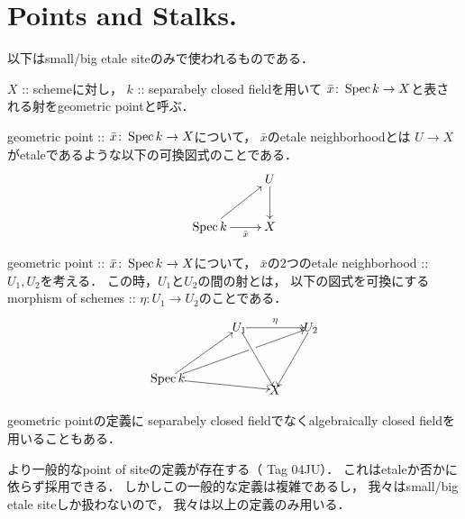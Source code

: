 \documentclass[a4paper, dvipdfmx]{jsarticle}
\begin{document}
\section{Points and Stalks.}
以下はsmall/big etale siteのみで使われるものである．
\begin{Def}
\begin{myenum}
    \item 
    $X$ :: schemeに対し，
    $k$ :: separabely closed fieldを用いて
    $\bar{x} \colon \operatorname{Spec} k \to X$と表される射をgeometric pointと呼ぶ．

    \item
    geometric point :: $\bar{x} \colon \operatorname{Spec} k \to X$について，
    $\bar{x}$のetale neighborhoodとは
    $U \to X$がetaleであるような以下の可換図式のことである．
    \[\xymatrix{
        {} & U \ar[d]\\
        \Spec k \ar[r]_-{\bar{x}} \ar[ru]& X
    }\]

    \item
    geometric point :: $\bar{x} \colon \operatorname{Spec} k \to X$について，
    $\bar{x}$の$2$つのetale neighborhood :: $U_1, U_2$を考える．
    この時，$U_1$と$U_2$の間の射とは，
    以下の図式を可換にするmorphism of schemes :: $\eta \colon U_1 \to U_2$のことである．
    \begin{equation*}
    \begin{xy}
        (0,17.32) *{U_1}="U1", (20, 17.32) *{U_2}="U2",
        (-20, 3) *{\Spec k}="k", (10,0) *{X}="X",
        \ar "U1";"X" \ar "U2";"X" \ar "U1";"U2"^{\eta}
        \ar "k";"U1" \ar|(.59)\hole "k";"U2" \ar "k";"X"
    \end{xy}
    \end{equation*}
\end{myenum}
\end{Def}

\begin{Remark}
    geometric pointの定義に
    separabely closed fieldでなくalgebraically closed fieldを用いることもある．
\end{Remark}

\begin{Remark}
    より一般的なpoint of siteの定義が存在する（\cite{SP} Tag 04JU）．
    これはetaleか否かに依らず採用できる．
    しかしこの一般的な定義は複雑であるし，
    我々はsmall/big etale siteしか扱わないので，
    我々は以上の定義のみ用いる．
\end{Remark}
\end{document}
